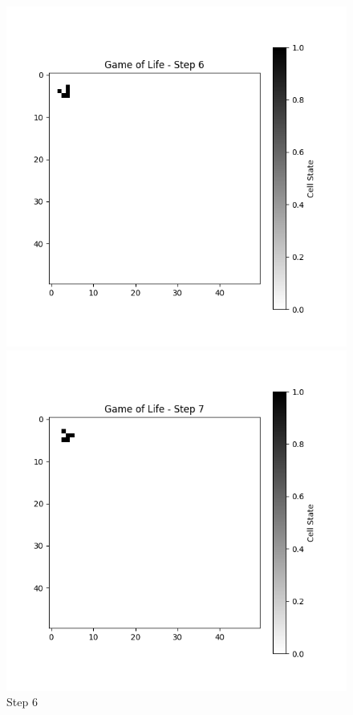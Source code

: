 \documentclass[10pt,letterpaper, onecolumn]{report}
\begin{document}
\begin{flushleft}
\begin{flushleft}
\begin{figure}[htbp!]
                        \begin{minipage}{0.3\textwidth}
                            \centering
                            \includegraphics[width=\textwidth]{../game_of_life_step_Game of Life - Step 6}
                            \caption{Step 6}
                        \end{minipage}%
                        \begin{minipage}{0.3\textwidth}
                            \centering
                            \includegraphics[width=\textwidth]{../game_of_life_step_Game of Life - Step 7}

\end{minipage}
\end{figure}
\end{flushleft}
\end{flushleft}
\end{document}
